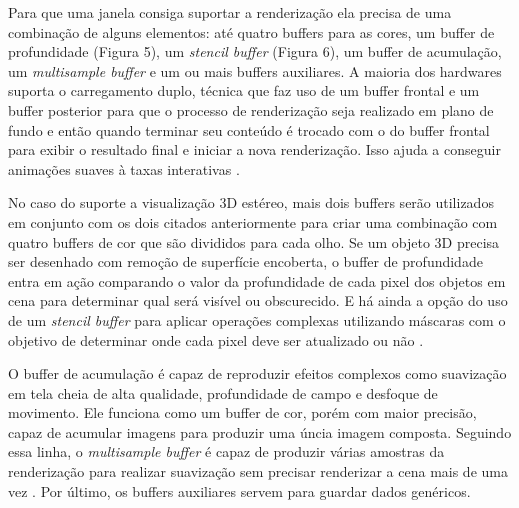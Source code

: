 Para que uma janela consiga suportar a renderização ela precisa de uma combinação de alguns elementos: até quatro buffers para as cores, um buffer de profundidade (Figura 5), um \textit{stencil buffer} (Figura 6), um buffer de acumulação, um \textit{multisample buffer} e um ou mais buffers auxiliares. A maioria dos hardwares suporta o carregamento duplo, técnica que faz uso de um buffer frontal e um buffer posterior para que o processo de renderização seja realizado em plano de fundo e então quando terminar seu conteúdo é trocado com o do buffer frontal para exibir o resultado final e iniciar a nova renderização. Isso ajuda a conseguir animações suaves à taxas interativas \cite{GLSLBook}.

\begin{figure}[h!]
	\centering
\end{figure}
\nocite{stcbuf}
	
No caso do suporte a visualização 3D estéreo, mais dois buffers serão utilizados em conjunto com os dois citados anteriormente para criar uma combinação com quatro buffers de cor que são divididos para cada olho. Se um objeto 3D precisa ser desenhado com remoção de superfície encoberta, o buffer de profundidade entra em ação comparando o valor da profundidade de cada pixel dos objetos em cena para determinar qual será visível ou obscurecido. E há ainda a opção do uso de um \textit{stencil buffer} para aplicar operações complexas utilizando máscaras com o objetivo de determinar onde cada pixel deve ser atualizado ou não \cite{GLSLBook}.

O buffer de acumulação é capaz de reproduzir efeitos complexos como suavização em tela cheia de alta qualidade, profundidade de campo e desfoque de movimento. Ele funciona como um buffer de cor, porém com maior precisão, capaz de acumular imagens para produzir uma úncia imagem composta. Seguindo essa linha, o \textit{multisample buffer} é capaz de produzir várias amostras da renderização para realizar suavização sem precisar renderizar a cena mais de uma vez \cite{GLSLBook}. Por último, os buffers auxiliares servem para guardar dados genéricos. 

